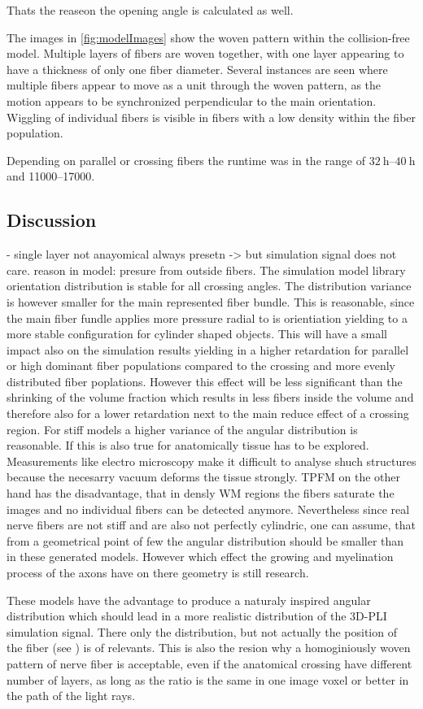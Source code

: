 Thats the reaseon the opening angle is calculated as well.
\par
% 
The images in \cref{fig:modelImages} show the woven pattern within the collision-free model.
Multiple layers of fibers are woven together, with one layer appearing to have a thickness of only one fiber diameter.
Several instances are seen where multiple fibers appear to move as a unit through the woven pattern,\eg{} as the motion appears to be synchronized perpendicular to the main orientation.
Wiggling of individual fibers is visible in fibers with a low density within the fiber population.
\par
% 
Depending on parallel or crossing fibers the runtime was in the range of $\SIrange{32}{40}{\hour}$ and \SIrange{11000}{17000}{\steps}.
% 
\subsection{Discussion}
%
% 
- single layer not anayomical always presetn -> but simulation signal does not care. reason in model: presure from outside fibers.
% 
The simulation model library orientation distribution is stable for all crossing angles.
The distribution variance is however smaller for the main represented fiber bundle.
This is reasonable, since the main fiber fundle applies more pressure radial to is orientiation yielding to a more stable configuration for cylinder shaped objects.
This will have a small impact also on the simulation results yielding in a higher retardation for parallel or high dominant fiber populations compared to the crossing and more evenly distributed fiber poplations.
However this effect will be less significant than the shrinking of the volume fraction which results in less fibers inside the volume and therefore also for a lower retardation next to the main reduce effect of a crossing region.
For stiff models a higher variance of the angular distribution is reasonable. 
If this is also true for anatomically tissue has to be explored.
Measurements like electro microscopy make it difficult to analyse shuch structures because the necesarry vacuum deforms the tissue strongly.
TPFM on the other hand has the disadvantage, that in densly \ac{WM} regions the fibers saturate the images and no individual fibers can be detected anymore.
Nevertheless since real nerve fibers are not stiff and are also not perfectly cylindric, one can assume, that from a geometrical point of few the angular distribution should be smaller than in these generated models.
However which effect the growing and myelination process of the axons have on there geometry is still \dummy{} research.

These models have the advantage to produce a naturaly inspired angular distribution which should lead in a more realistic distribution of the \ac{3D-PLI} simulation signal.
There only the distribution, but not actually the position of the fiber (see \dummy{}) is of relevants.
This is also the resion why a homoginiously woven pattern of nerve fiber is acceptable, even if the anatomical crossing have different number of layers, as long as the ratio is the same in one image voxel or better in the path of the light rays.